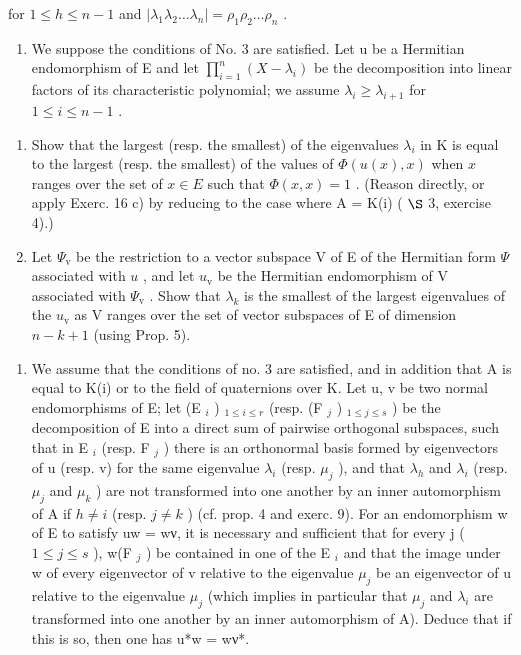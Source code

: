 for \(1 \leqslant h \leqslant n - 1\) and \(|\lambda_1\lambda_2 \ldots \lambda_n| = \rho_1\rho_2 \ldots \rho_n\) .

\begin{enumerate}
\def\labelenumi{\arabic{enumi})}
\setcounter{enumi}{20}
\tightlist
\item
  We suppose the conditions of No. 3 are satisfied. Let u be a Hermitian endomorphism of E and let \(\prod_{i=1}^{n}(X-\lambda_{i})\) be the decomposition into linear factors of its characteristic polynomial; we assume \(\lambda_{i}\geqslant\lambda_{i+1}\) for \(1\leqslant i\leqslant n-1\) .
\end{enumerate}

\begin{enumerate}
\def\labelenumi{\alph{enumi})}
\item
  Show that the largest (resp. the smallest) of the eigenvalues \(\lambda_{i}\) in K is equal to the largest (resp. the smallest) of the values of \(\Phi(u(x), x)\) when \(x\) ranges over the set of \(x \in E\) such that \(\Phi(x, x) = 1\) . (Reason directly, or apply Exerc. 16 c) by reducing to the case where A = K(i) ( \(\S\) 3, exercise 4).)
\item
  Let \(\Psi_{\mathrm{v}}\) be the restriction to a vector subspace V of E of the Hermitian form \(\Psi\) associated with \(u\) , and let \(u_{\mathrm{v}}\) be the Hermitian endomorphism of V associated with \(\Psi_{\mathrm{v}}\) . Show that \(\lambda_{k}\) is the smallest of the largest eigenvalues of the \(u_{\mathrm{v}}\) as V ranges over the set of vector subspaces of E of dimension \(n - k + 1\) (using Prop. 5).
\end{enumerate}

\begin{enumerate}
\def\labelenumi{\arabic{enumi})}
\setcounter{enumi}{21}
\tightlist
\item
  We assume that the conditions of no. 3 are satisfied, and in addition that A is equal to K(i) or to the field of quaternions over K. Let u, v be two normal endomorphisms of E; let (E \(_{i}\) ) \(_{1\leqslant i\leqslant r}\) (resp. (F \(_{j}\) ) \(_{1\leqslant j\leqslant s}\) ) be the decomposition of E into a direct sum of pairwise orthogonal subspaces, such that in E \(_{i}\) (resp. F \(_{j}\) ) there is an orthonormal basis formed by eigenvectors of u (resp. v) for the same eigenvalue \(\lambda_{i}\) (resp. \(\mu_{j}\) ), and that \(\lambda_{h}\) and \(\lambda_{i}\) (resp. \(\mu_{j}\) and \(\mu_{k}\) ) are not transformed into one another by an inner automorphism of A if \(h\neq i\) (resp. \(j\neq k\) ) (cf. prop. 4 and exerc. 9). For an endomorphism w of E to satisfy uw = wν, it is necessary and sufficient that for every j ( \(1\leqslant j\leqslant s\) ), w(F \(_{j}\) ) be contained in one of the E \(_{i}\) and that the image under w of every eigenvector of v relative to the eigenvalue \(\mu_{j}\) be an eigenvector of u relative to the eigenvalue \(\mu_{j}\) (which implies in particular that \(\mu_{j}\) and \(\lambda_{i}\) are transformed into one another by an inner automorphism of A). Deduce that if this is so, then one has u*w = wν*.
\end{enumerate}


